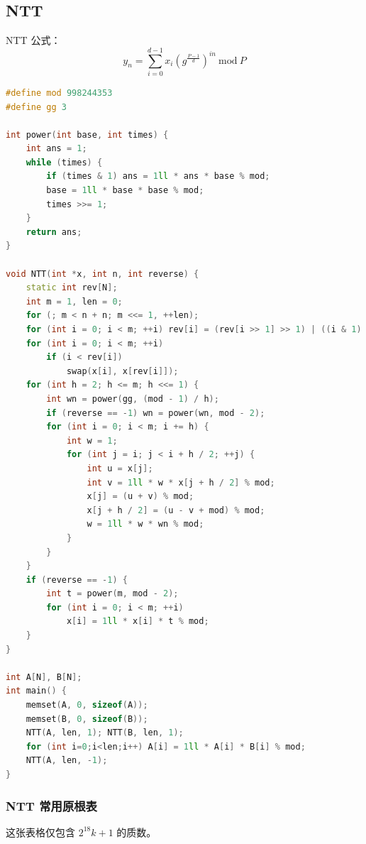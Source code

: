 \documentclass{article}
\begin{document}
\subsection{NTT}

NTT 公式： $$ y_n = \sum\limits_{i = 0}^{d-1} x_i(g^{\frac{P-1}{d}})^{in} \ \text{mod} \ P $$

\begin{lstlisting}[language=C++]
#define mod 998244353
#define gg 3

int power(int base, int times) {
	int ans = 1;
	while (times) {
		if (times & 1) ans = 1ll * ans * base % mod;
		base = 1ll * base * base % mod;
		times >>= 1;
	}
	return ans;
}

void NTT(int *x, int n, int reverse) {
	static int rev[N];
	int m = 1, len = 0;
	for (; m < n + n; m <<= 1, ++len);
	for (int i = 0; i < m; ++i) rev[i] = (rev[i >> 1] >> 1) | ((i & 1) << (len - 1));
	for (int i = 0; i < m; ++i)
		if (i < rev[i])
			swap(x[i], x[rev[i]]);
	for (int h = 2; h <= m; h <<= 1) {
		int wn = power(gg, (mod - 1) / h);
		if (reverse == -1) wn = power(wn, mod - 2);
		for (int i = 0; i < m; i += h) {
			int w = 1;
			for (int j = i; j < i + h / 2; ++j) {
				int u = x[j];
				int v = 1ll * w * x[j + h / 2] % mod;
				x[j] = (u + v) % mod;
				x[j + h / 2] = (u - v + mod) % mod;
				w = 1ll * w * wn % mod;
			}
		}
	}
	if (reverse == -1) {
		int t = power(m, mod - 2);
		for (int i = 0; i < m; ++i)
			x[i] = 1ll * x[i] * t % mod;
	}
}

int A[N], B[N];
int main() {
	memset(A, 0, sizeof(A));
	memset(B, 0, sizeof(B));
	NTT(A, len, 1); NTT(B, len, 1);
	for (int i=0;i<len;i++) A[i] = 1ll * A[i] * B[i] % mod;
	NTT(A, len, -1);
}
\end{lstlisting}

\subsubsection{NTT 常用原根表}

这张表格仅包含 $2^{18}k + 1$ 的质数。
\end{document}
